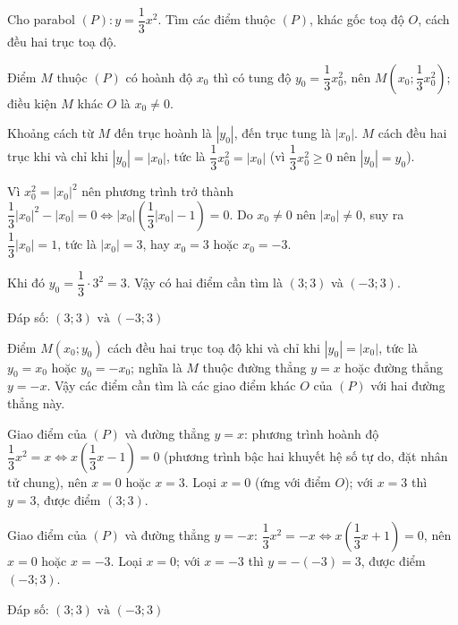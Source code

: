 \begin{problem}[9DS-HSB2-027]
Cho parabol $(P)\colon y = \dfrac{1}{3}x^2$. Tìm các điểm thuộc $(P)$, khác gốc toạ độ $O$, cách đều hai trục toạ độ.

\begin{solution}
Điểm $M$ thuộc $(P)$ có hoành độ $x_0$ thì có tung độ $y_0 = \dfrac{1}{3}x_0^2$, nên $M\left(x_0; \dfrac{1}{3}x_0^2\right)$; điều kiện $M$ khác $O$ là $x_0 \neq 0$.

Khoảng cách từ $M$ đến trục hoành là $|y_0|$, đến trục tung là $|x_0|$. $M$ cách đều hai trục khi và chỉ khi $|y_0| = |x_0|$, tức là $\dfrac{1}{3}x_0^2 = |x_0|$ (vì $\dfrac{1}{3}x_0^2 \geq 0$ nên $|y_0| = y_0$).

Vì $x_0^2 = |x_0|^2$ nên phương trình trở thành $\dfrac{1}{3}|x_0|^2 - |x_0| = 0 \Leftrightarrow |x_0|\left(\dfrac{1}{3}|x_0| - 1\right) = 0$. Do $x_0 \neq 0$ nên $|x_0| \neq 0$, suy ra $\dfrac{1}{3}|x_0| = 1$, tức là $|x_0| = 3$, hay $x_0 = 3$ hoặc $x_0 = -3$.

Khi đó $y_0 = \dfrac{1}{3} \cdot 3^2 = 3$. Vậy có hai điểm cần tìm là $(3; 3)$ và $(-3; 3)$.

Đáp số: $\boxed{(3; 3) \text{ và } (-3; 3)}$
\end{solution}

\begin{solution}
Điểm $M(x_0; y_0)$ cách đều hai trục toạ độ khi và chỉ khi $|y_0| = |x_0|$, tức là $y_0 = x_0$ hoặc $y_0 = -x_0$; nghĩa là $M$ thuộc đường thẳng $y = x$ hoặc đường thẳng $y = -x$. Vậy các điểm cần tìm là các giao điểm khác $O$ của $(P)$ với hai đường thẳng này.

Giao điểm của $(P)$ và đường thẳng $y = x$: phương trình hoành độ $\dfrac{1}{3}x^2 = x \Leftrightarrow x\left(\dfrac{1}{3}x - 1\right) = 0$ (phương trình bậc hai khuyết hệ số tự do, đặt nhân tử chung), nên $x = 0$ hoặc $x = 3$. Loại $x = 0$ (ứng với điểm $O$); với $x = 3$ thì $y = 3$, được điểm $(3; 3)$.

Giao điểm của $(P)$ và đường thẳng $y = -x$: $\dfrac{1}{3}x^2 = -x \Leftrightarrow x\left(\dfrac{1}{3}x + 1\right) = 0$, nên $x = 0$ hoặc $x = -3$. Loại $x = 0$; với $x = -3$ thì $y = -(-3) = 3$, được điểm $(-3; 3)$.

Đáp số: $\boxed{(3; 3) \text{ và } (-3; 3)}$
\end{solution}
\end{problem}

